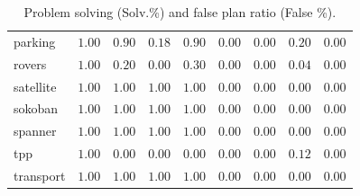 \begin{table}[t]
{\begin{tabular}{|l|cccc|cccc|}
parking & $\mathbf{1.00}$ & $0.90$ & $0.18$ & $0.90$ & $\mathbf{0.00}$ & $\mathbf{0.00}$ & $0.20$ & $\mathbf{0.00}$ \\
rovers & $\mathbf{1.00}$ & $0.20$ & $0.00$ & $0.30$ & $\mathbf{0.00}$ & $\mathbf{0.00}$ & $0.04$ & $\mathbf{0.00}$ \\
satellite & $\mathbf{1.00}$ & $\mathbf{1.00}$ & $\mathbf{1.00}$ & $\mathbf{1.00}$ & $\mathbf{0.00}$ & $\mathbf{0.00}$ & $\mathbf{0.00}$ & $\mathbf{0.00}$ \\
sokoban & $\mathbf{1.00}$ & $\mathbf{1.00}$ & $\mathbf{1.00}$ & $\mathbf{1.00}$ & $\mathbf{0.00}$ & $\mathbf{0.00}$ & $\mathbf{0.00}$ & $\mathbf{0.00}$ \\
spanner & $\mathbf{1.00}$ & $\mathbf{1.00}$ & $\mathbf{1.00}$ & $\mathbf{1.00}$ & $\mathbf{0.00}$ & $\mathbf{0.00}$ & $\mathbf{0.00}$ & $\mathbf{0.00}$ \\
tpp & $\mathbf{1.00}$ & $0.00$ & $0.00$ & $0.00$ & $\mathbf{0.00}$ & $\mathbf{0.00}$ & $0.12$ & $\mathbf{0.00}$ \\
transport & $\mathbf{1.00}$ & $\mathbf{1.00}$ & $\mathbf{1.00}$ & $\mathbf{1.00}$ & $\mathbf{0.00}$ & $\mathbf{0.00}$ & $\mathbf{0.00}$ & $\mathbf{0.00}$ \\
\hline
\end{tabular}
}
\caption{\small{Problem solving (Solv.\%) and false plan ratio (False \%).}}
\label{tab:solvingfalseplans}
\end{table}
